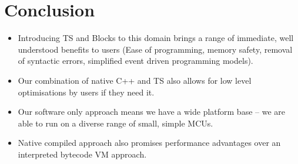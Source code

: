 \section{Conclusion}
\label{sec:conclude}

\begin{itemize}
    \item Introducing TS and Blocks to this domain brings a range of immediate, 
        well understood benefits to users (Ease of programming, memory safety, 
        removal of syntactic errors, simplified event driven programming models). 
    \item Our combination of native C++ and TS also allows for low level optimisations 
          by users if they need it.
    \item Our software only approach means we have a wide platform base – 
         we are able to run on a diverse range of small, simple MCUs.
    \item Native compiled approach also promises performance advantages over 
          an interpreted bytecode VM approach.
\end{itemize}



